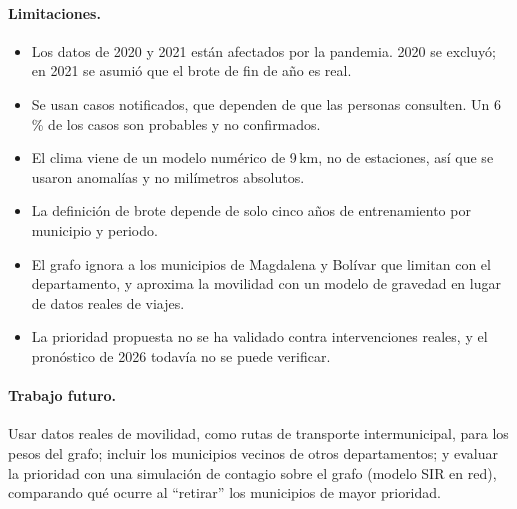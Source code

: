 \documentclass[11pt,letterpaper]{article}
\begin{document}
\paragraph{Limitaciones.}
\begin{itemize}
  \item Los datos de 2020 y 2021 están afectados por la pandemia. 2020 se excluyó; en 2021 se asumió que el brote de fin de año es real.
  \item Se usan casos notificados, que dependen de que las personas consulten. Un 6\,\% de los casos son probables y no confirmados.
  \item El clima viene de un modelo numérico de 9\,km, no de estaciones, así que se usaron anomalías y no milímetros absolutos.
  \item La definición de brote depende de solo cinco años de entrenamiento por municipio y periodo.
  \item El grafo ignora a los municipios de Magdalena y Bolívar que limitan con el departamento, y aproxima la movilidad con un modelo de gravedad en lugar de datos reales de viajes.
  \item La prioridad propuesta no se ha validado contra intervenciones reales, y el pronóstico de 2026 todavía no se puede verificar.
\end{itemize}

\paragraph{Trabajo futuro.} Usar datos reales de movilidad, como rutas de transporte intermunicipal, para los pesos del grafo; incluir los municipios vecinos de otros departamentos; y evaluar la prioridad con una simulación de contagio sobre el grafo (modelo SIR en red), comparando qué ocurre al ``retirar'' los municipios de mayor prioridad.
\end{document}
